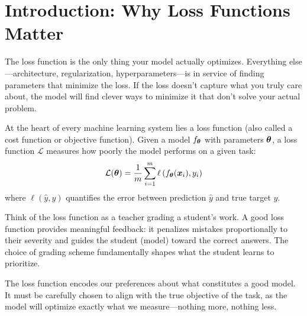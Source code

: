 \documentclass[../../main.tex]{subfiles}
\begin{document}
\section{Introduction: Why Loss Functions Matter}
\label{sec:loss-intro}

\begin{important}
The loss function is the only thing your model actually optimizes. Everything else---architecture, regularization, hyperparameters---is in service of finding parameters that minimize the loss. If the loss doesn't capture what you truly care about, the model will find clever ways to minimize it that don't solve your actual problem.
\end{important}

At the heart of every machine learning system lies a loss function (also called a cost function or objective function). Given a model $f_{\boldsymbol{\theta}}$ with parameters $\boldsymbol{\theta}$, a loss function $\mathcal{L}$ measures how poorly the model performs on a given task:
\[
    \mathcal{L}(\boldsymbol{\theta}) = \frac{1}{m} \sum_{i=1}^{m} \ell\left(f_{\boldsymbol{\theta}}(\boldsymbol{x}_i), y_i\right)
\]
where $\ell(\hat{y}, y)$ quantifies the error between prediction $\hat{y}$ and true target $y$.

\begin{intuition}
Think of the loss function as a teacher grading a student's work. A good loss function provides meaningful feedback: it penalizes mistakes proportionally to their severity and guides the student (model) toward the correct answers. The choice of grading scheme fundamentally shapes what the student learns to prioritize.
\end{intuition}

\begin{principle}
The loss function encodes our preferences about what constitutes a good model. It must be carefully chosen to align with the true objective of the task, as the model will optimize exactly what we measure---nothing more, nothing less.
\end{principle}
\end{document}
